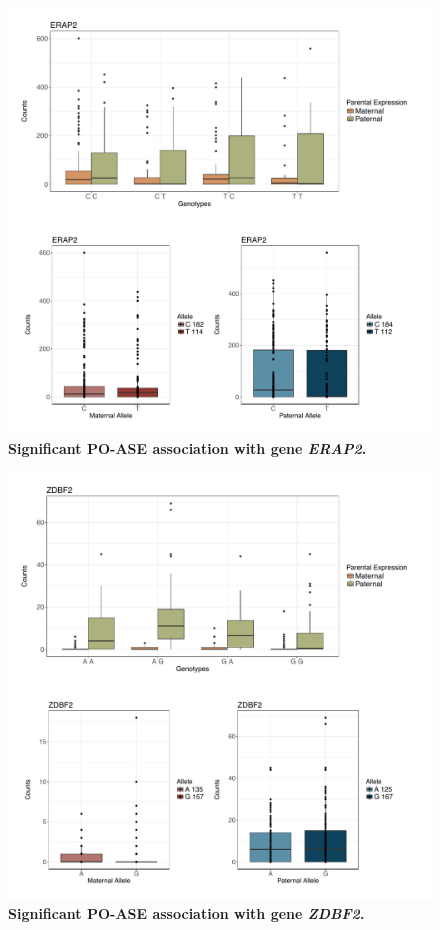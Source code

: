 \begin{figure}[!htb]
\centering \includegraphics[width=5in]{img/ch04/fig-09-ERAP2.pdf}
\caption[Significant PO-ASE association with gene \emph{ERAP2}.]{\textbf{Significant PO-ASE association with gene \emph{ERAP2}.} }
\label{fig:ERAP2}
\end{figure}


\begin{figure}[!htb]
\centering \includegraphics[width=5in]{img/ch04/fig-10-ZDBF2.pdf}
\caption[Significant PO-ASE association with gene \emph{ZDBF2}.]{\textbf{Significant PO-ASE association with gene \emph{ZDBF2}.} }
\label{fig:ZDBF2}
\end{figure}


